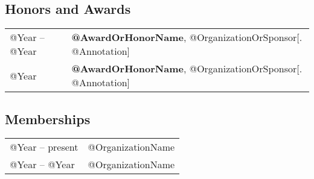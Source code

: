 \documentclass[10pt]{article}
\begin{document}
\subsection*{Honors and Awards}
\smallskip

\quad
\begin{tabular}{l@{\quad\ }p{35em}}
 @Year -- @Year
 & {\bf @AwardOrHonorName}, @OrganizationOrSponsor[. @Annotation]
 \\[.5ex]
 @Year
 & {\bf @AwardOrHonorName}, @OrganizationOrSponsor[. @Annotation]
 \\[.5ex]
\end{tabular}


\subsection*{Memberships}
\smallskip

\quad
\begin{tabular}{l@{\quad\ }p{35em}}
 @Year -- present
 & @OrganizationName
 \\[.5ex]
 @Year -- @Year
 & @OrganizationName
 \\[.5ex]
\end{tabular}
\end{document}

